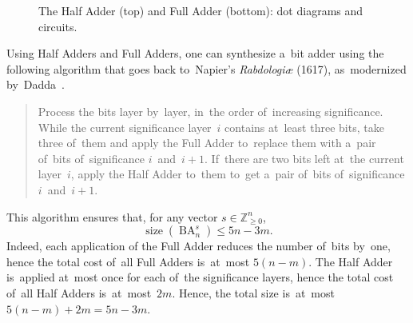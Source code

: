 \documentclass[a4paper, UKenglish, cleveref, autoref,  thm-restate, anonymous]{lipics-v2021}
\DeclareMathOperator{\BA}{BA}
\begin{document}
\begin{figure}
\begin{center}
        \end{center}
        \caption{The Half Adder (top) and Full Adder (bottom): dot diagrams and circuits.}
        \label{figure:sum23}
    \end{figure}

    Using Half Adders and Full Adders, one can synthesize a~bit adder using the following algorithm that goes back to~Napier's \emph{Rabdologiæ} (1617),
    as~modernized by~Dadda~\cite{dadda}.
    \begin{quote}
        Process the bits layer by~layer, in~the order of~increasing significance.
        While the current significance layer~$i$ contains at~least three bits,
        take three of~them and apply the Full Adder to~replace them with a~pair of~bits
        of~significance $i$~and~$i+1$. If~there are two bits left at~the current layer~$i$, apply the Half Adder to~them to~get a~pair of~bits of~significance $i$~and~$i+1$.
    \end{quote}
    This algorithm ensures that, for any vector $s \in \mathbb{Z}_{\ge 0}^n$,
    \[\operatorname{size}(\BA_n^s) \le 5n-3m.\]
    Indeed, each application of the Full Adder reduces the number of~bits by~one,
    hence the total cost of~all Full Adders is~at~most $5(n-m)$. The Half Adder is~applied at~most once for each of~the significance layers, hence
    the total cost of~all Half Adders is~at~most~$2m$. Hence, the total size
    is~at~most $5(n-m)+2m=5n-3m$.
\end{document}
